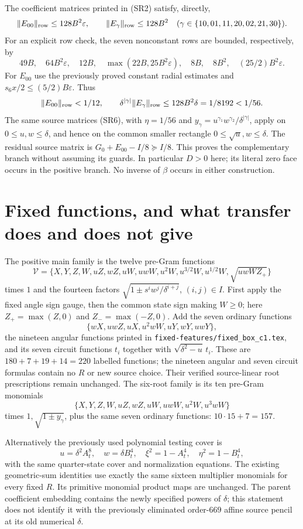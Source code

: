 \documentclass[10pt]{article}
\newcommand{\eps}{\varepsilon}
\newcommand{\norm}[1]{\lVert#1\rVert_{\rm row}}
\begin{document}
The coefficient matrices printed in (SR2) satisfy, directly,
\[
 \norm{E_{00}}\le128B^2\eps,\qquad
 \norm{E_\gamma}\le128B^2\quad
 (\gamma\in\{10,01,11,20,02,21,30\}).
\]
For an explicit row check, the seven nonconstant rows are bounded,
respectively, by
\[
 49B,\quad64B^2\eps,\quad12B,\quad
 \max(22B,25B^2\eps),\quad8B,\quad8B^2,\quad
 (25/2)B^2\eps.
\]
For $E_{00}$ use the previously proved constant radial estimates
and $s_6x/2\le(5/2)B\eps$.
Thus
\[
 \norm{E_{00}}<1/12,\qquad
 \delta^{|\gamma|}\norm{E_\gamma}\le128B^2\delta
                                      =1/8192<1/56.
\]
The same source matrices (SR6), with $\eta=1/56$ and
$y_\gamma=u^{\gamma_1}w^{\gamma_2}/\delta^{|\gamma|}$, apply
on $0\le u,w\le\delta$, and hence on the common smaller rectangle
$0\le\sqrt u,w\le\delta$. The residual source matrix is
$G_0+E_{00}-I/8\succeq I/8$.
This proves the complementary branch without assuming its guards.
In particular $D>0$ here; its literal zero face occurs in the positive
branch. No inverse of $\beta$ occurs in either construction.

\section{Fixed functions, and what transfer does and does not give}

The positive main family is the twelve pre-Gram functions
\[
 \mathcal V=\{X,Y,Z,W,uZ,wZ,uW,uwW,u^2W,
                 u^{3/2}W,u^{1/2}W,\sqrt{uwWZ_+}\}
\]
times $1$ and the fourteen factors
$\sqrt{1\pm s^iw^j/\delta^{i+j}}$, $(i,j)\in I$.
First apply the fixed angle sign gauge, then the common state sign
making $W\ge0$; here $Z_+=\max(Z,0)$ and $Z_- =\max(-Z,0)$.
Add the seven ordinary functions
\[
 \{wX,uwZ,uX,u^2wW,uY,wY,uwY\},
\]
the nineteen angular functions printed in
\texttt{fixed-features/fixed\_box\_c1.tex}, and its seven circuit
functions $t_i$ together with $\sqrt{\delta^2-u}\,t_i$.
These are $180+7+19+14=220$ labelled functions; the nineteen angular
and seven circuit formulas contain no $R$ or new source choice.
Their verified source-linear root prescriptions remain unchanged.
The six-root family is its ten pre-Gram monomials
\[
 \{X,Y,Z,W,uZ,wZ,uW,uwW,u^2W,u^3wW\}
\]
times $1,\sqrt{1\pm y_\gamma}$, plus the same seven ordinary functions:
$10\cdot15+7=157$.

Alternatively the previously used polynomial testing cover is
\[
 u=\delta^2A_t^8,\quad w=\delta B_t^4,\quad
 \xi^2=1-A_t^4,\quad\eta^2=1-B_t^4,
\]
with the same quarter-state cover and normalization equations.
The existing geometric-sum identities use
exactly the same sixteen multiplier monomials for every fixed $R$.
Its primitive monomial product maps are unchanged. The parent
coefficient embedding contains the newly specified powers of $\delta$;
this statement does not identify it with the previously eliminated
order-$669$ affine source pencil at its old numerical $\delta$.
\end{document}
